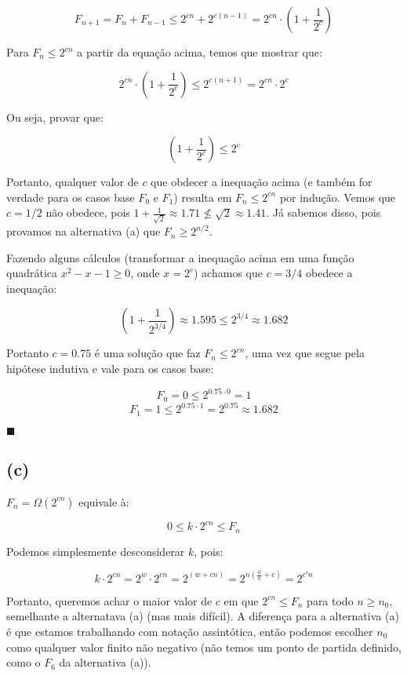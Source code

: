 \documentclass[12pt, a4paper]{article}
\begin{document}
\[ F_{n+1} = F_n + F_{n-1} \leq 2^{cn} + 2^{c(n-1)} = 2^{cn} \cdot \left( 1 + \frac{1}{2^c} \right) \]

Para  $F_n \leq 2^{cn}$ a partir da equação acima, temos que mostrar que:

\[ 2^{cn} \cdot \left( 1 + \frac{1}{2^c} \right) \leq 2^{c(n+1)} = 2^{cn} \cdot 2^c \]

Ou seja, provar que:

\[ \left( 1 + \frac{1}{2^c} \right) \leq 2^c \]

Portanto, qualquer valor de $c$ que obdecer a inequação acima (e também for verdade para os casos base $F_0$ e $F_1$) resulta em $F_n \leq 2^{cn}$ por indução. Vemos que $c=1/2$ não obedece, pois $1 + \frac{1}{\sqrt{2}} \approx 1.71 \nleq \sqrt{2} \approx 1.41$. Já sabemos disso, pois provamos na alternativa (a) que $F_n \geq 2^{n/2}$.

Fazendo alguns cálculos (transformar a inequação acima em uma função quadrática $x^2 -x -1 \geq 0$, onde $x=2^c$) achamos que $c=3/4$ obedece a inequação:

\[ \left( 1 + \frac{1}{2^{3/4}} \right) \approx 1.595 \leq 2^{3/4} \approx 1.682 \]

Portanto $c=0.75$ é uma solução que faz $F_n \leq 2^{cn}$, uma vez que segue pela hipótese indutiva e vale para os casos base:

\[ F_0 = 0 \leq 2^{0.75 \cdot 0} = 1 \]
\[ F_1 = 1 \leq 2^{0.75 \cdot 1} = 2^{0.75} \approx 1.682 \]

$\blacksquare$

\subsection*{(c)}

$F_n = \Omega(2^{cn})$ equivale à:

\[ 0 \leq k \cdot 2^{cn} \leq F_n \]

Podemos simplesmente desconsiderar $k$, pois:

\[ k \cdot 2^{cn} = 2^w \cdot 2^{cn} = 2^{(w + cn)} = 2^{n(\frac{w}{n} + c)} = 2^{c'n} \]

Portanto, queremos achar o maior valor de $c$ em que $2^{cn} \leq F_n$ para todo $n \geq n_0$, semelhante a alternatava (a) (mas mais difícil). A diferença para a alternativa (a) é que estamos trabalhando com notação assintótica, então podemos escolher $n_0$ como qualquer valor finito não negativo (não temos um ponto de partida definido, como o $F_6$ da alternativa (a)).
\end{document}
